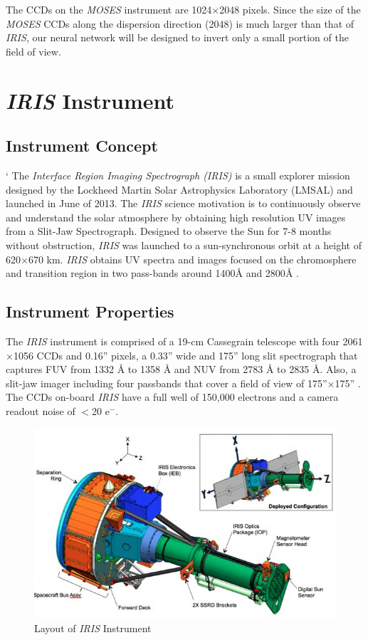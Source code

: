\documentclass[10pt,a4paper,titlepage]{article}
\begin{document}
			The CCDs on the \textit{MOSES} instrument are 1024$\times$2048 pixels. Since the size of the \textit{MOSES} CCDs along the dispersion direction (2048) is much larger than that of \textit{IRIS}, our neural network will be designed to invert only a small portion of the field of view.

			
	\section{\textit{IRIS} Instrument}
		\subsection{Instrument Concept}`
			 The \textit{Interface Region Imaging Spectrograph (IRIS)} is a small explorer mission designed by the Lockheed Martin Solar Astrophysics Laboratory (LMSAL) and launched in June of 2013. The \textit{IRIS} science motivation is to continuously observe and understand the solar atmosphere by obtaining high resolution UV images from a Slit-Jaw Spectrograph. Designed to observe the Sun for 7-8 months without obstruction, \textit{IRIS} was launched to a sun-synchronous orbit at a height of 620$\times$670 km. \textit{IRIS} obtains UV spectra and images focused on the chromosphere and transition region in two pass-bands around 1400{\AA} and 2800{\AA} \cite{ITN1}.
			 
		\subsection{Instrument Properties}
			The \textit{IRIS} instrument is comprised of a 19-cm  Cassegrain telescope with four 2061$\times$1056 CCDs and 0.16'' pixels, a 0.33'' wide and 175'' long slit spectrograph that captures FUV from 1332 {\AA} to 1358 {\AA} and NUV from 2783 {\AA} to 2835 {\AA}. Also, a slit-jaw imager including four passbands that cover a field of view of 175''$\times$175'' \cite{IRIS}. The CCDs on-board \textit{IRIS}  have a full well of 150,000 electrons and a camera readout noise of $<$20 e$^-$. 
			
				\begin{figure}[H]
					\includegraphics[scale=0.6]{iris}
					\centering
					\caption{Layout of \textit{IRIS} Instrument}
					\centering
				\end{figure}
		
\end{document}
